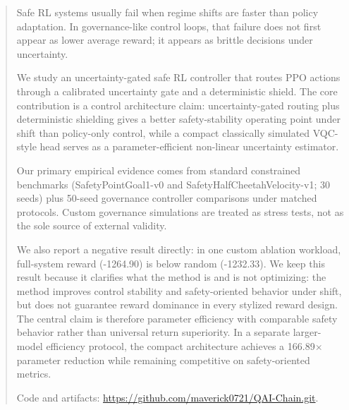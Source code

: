 \begin{abstract}
Safe RL systems usually fail when regime shifts are faster than policy adaptation. In governance-like control loops, that failure does not first appear as lower average reward; it appears as brittle decisions under uncertainty.

We study an uncertainty-gated safe RL controller that routes PPO actions through a calibrated uncertainty gate and a deterministic shield. The core contribution is a control architecture claim: uncertainty-gated routing plus deterministic shielding gives a better safety-stability operating point under shift than policy-only control, while a compact classically simulated VQC-style head serves as a parameter-efficient non-linear uncertainty estimator.

Our primary empirical evidence comes from standard constrained benchmarks (SafetyPoint\-Goal1-v0 and SafetyHalf\-Cheetah\-Velocity-v1; 30 seeds) plus 50-seed governance controller comparisons under matched protocols. Custom governance simulations are treated as stress tests, not as the sole source of external validity.

We also report a negative result directly: in one custom ablation workload, full-system reward (-1264.90) is below random (-1232.33). We keep this result because it clarifies what the method is and is not optimizing: the method improves control stability and safety-oriented behavior under shift, but does not guarantee reward dominance in every stylized reward design. The central claim is therefore parameter efficiency with comparable safety behavior rather than universal return superiority. In a separate larger-model efficiency protocol, the compact architecture achieves a 166.89$\times$ parameter reduction while remaining competitive on safety-oriented metrics.

Code and artifacts: \url{https://github.com/maverick0721/QAI-Chain.git}.
\end{abstract}
